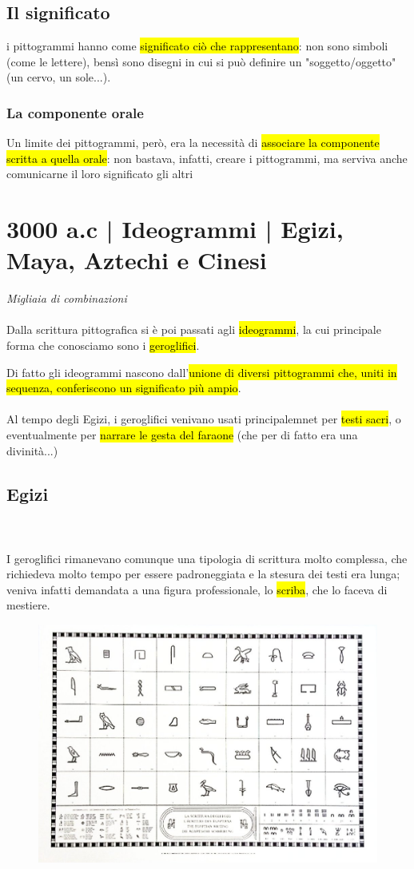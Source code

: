     \subsection{Il significato}
    i pittogrammi hanno come \hl{significato ciò che rappresentano}: non sono simboli (come le lettere), bensì sono disegni in cui si può definire un "soggetto/oggetto" (un cervo, un sole...).
    \subsubsection{La componente orale}
    Un limite dei pittogrammi, però, era la necessità di \hl{associare la componente scritta a quella orale}: non bastava, infatti, creare i pittogrammi, ma serviva anche comunicarne il loro significato gli altri

\section{3000 a.c | Ideogrammi | Egizi, Maya, Aztechi e Cinesi}
{\huge \textit{Migliaia di combinazioni}}\\\\
Dalla scrittura pittografica si è poi passati agli \hl{ideogrammi}, la cui principale forma che conosciamo sono i \hl{geroglifici}.

Di fatto gli ideogrammi nascono dall'\hl{unione di diversi pittogrammi che, uniti in sequenza, conferiscono un significato più ampio}.
\\\\Al tempo degli Egizi, i geroglifici venivano usati principalemnet per \hl{testi sacri}, o eventualmente per \hl{narrare le gesta del faraone} (che per di fatto era una divinità...)

\subsection{Egizi}
\\\\I geroglifici rimanevano comunque una tipologia di scrittura molto complessa, che richiedeva molto tempo per essere padroneggiata e la stesura dei testi era lunga; veniva infatti demandata a una figura professionale, lo \hl{scriba}, che lo faceva di mestiere.

\begin{figure}[H]
    \centering
    \includegraphics[width=0.4\linewidth]{blocco_3 - storia della scrittura/imgs/61Ucl1IMomL.jpg}
\end{figure}

